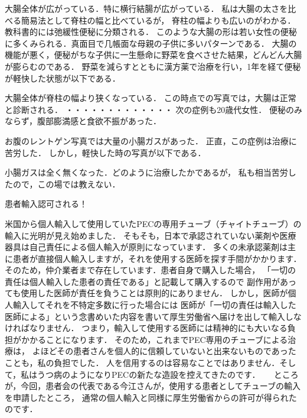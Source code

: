 大腸全体が広がっている．特に横行結腸が広がっている．
私は大腸の太さを比べる簡易法として脊柱の幅と比べているが，
脊柱の幅よりも広いのがわかる．教科書的には弛緩性便秘に分類される．
このような大腸の形は若い女性の便秘に多くみられる．真面目で几帳面な母親の子供に多いパターンである．
大腸の機能が悪く，便秘がちな子供に一生懸命に野菜を食べさせた結果，どんどん大腸が膨らむのである．
野菜を減らすとともに漢方薬で治療を行い，1年を経て便秘が軽快した状態が以下である．

大腸全体が脊柱の幅より狭くなっている．
この時点での写真では，大腸は正常と診断される．
・・・・・・・・・・・・・
次の症例も20歳代女性．
便秘のみならず，腹部膨満感と食欲不振があった．

お腹のレントゲン写真では大量の小腸ガスがあった．
正直，この症例は治療に苦労した．
しかし，軽快した時の写真が以下である．

小腸ガスは全く無くなった．どのように治療したかであるが，
私も相当苦労したので，この場では教えない．

患者輸入認可される！

米国から個人輸入して使用していたPECの専用チューブ（チャイトチューブ）の輸入に光明が見え始めました．
そもそも，日本で承認されていない薬剤や医療器具は自己責任による個人輸入が原則になっています．
多くの未承認薬剤は主に患者が直接個人輸入しますが，それを使用する医師を探す手間がかかります．
そのため，仲介業者まで存在しています．患者自身で購入した場合，
「一切の責任は個人輸入した患者の責任である」と記載して購入するので
副作用があっても使用した医師が責任を負うことは原則的にありません．
しかし，医師が個人輸入してそれを不特定多数に行った場合には
医師が「一切の責任は輸入した医師による」という念書めいた内容を書いて厚生労働省へ届けを出して輸入しなければなりません．
つまり，輸入して使用する医師には精神的にも大いなる負担がかかることになります．
そのため，これまでPEC専用のチューブによる治療は，
よほどその患者さんを個人的に信頼していないと出来ないものであったことも，私の負担でした．
人を信用するのは容易なことではありません．そして，私はうつ病のようになりPECの新たな造設を控えてきたのです．
　 
ところが，今回，患者会の代表である今江さんが，使用する患者としてチューブの輸入を申請したところ，
通常の個人輸入と同様に厚生労働省からの許可が得られたのです．

